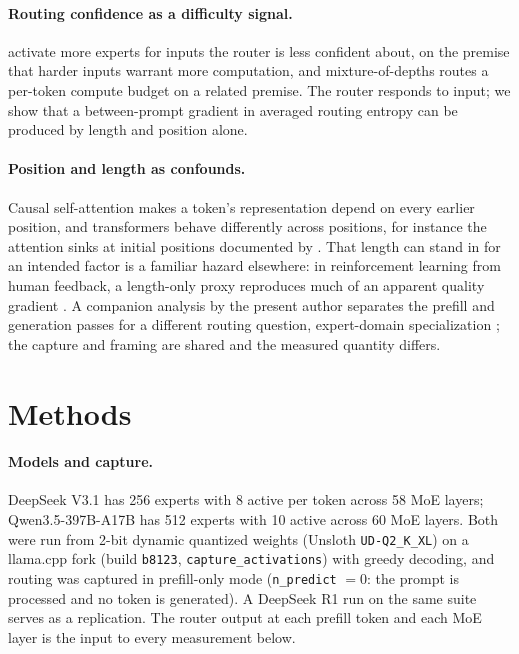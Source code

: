 \documentclass[10pt,twocolumn]{article}
\begin{document}
\paragraph{Routing confidence as a difficulty signal.}
\citet{huang2024harder} activate more experts for inputs the router is less
confident about, on the premise that harder inputs warrant more computation,
and mixture-of-depths \citep{raposo2024mixture} routes a per-token compute
budget on a related premise. The router responds to input; we show that a between-prompt gradient in
averaged routing entropy can be produced by length and position alone.

\paragraph{Position and length as confounds.}
Causal self-attention \citep{vaswani2017attention} makes a token's
representation depend on every earlier position, and transformers behave
differently across positions, for instance the attention sinks at initial
positions documented by \citet{xiao2024streaming}. That length can stand in
for an intended factor is a familiar hazard elsewhere: in reinforcement
learning from human feedback, a length-only proxy reproduces much of an
apparent quality gradient \citep{singhal2024length}. A companion analysis
by the present author separates the prefill and generation passes for a
different routing question, expert-domain specialization
\citep{shorthill2026generation}; the capture and framing are shared and the
measured quantity differs.

\section{Methods}
\label{sec:methods}

\paragraph{Models and capture.}
DeepSeek V3.1 \citep{deepseekai2024v3} has 256 experts with 8 active per
token across 58 MoE layers; Qwen3.5-397B-A17B \citep{yang2025qwen3} has 512
experts with 10 active across 60 MoE layers. Both were run from 2-bit dynamic
quantized weights (Unsloth \texttt{UD-Q2\_K\_XL}) on a llama.cpp fork (build
\texttt{b8123}, \texttt{capture\_activations}) with greedy decoding, and
routing was captured in prefill-only mode (\texttt{n\_predict} $=0$: the
prompt is processed and no token is generated). A DeepSeek R1 run
\citep{deepseekai2025r1} on the same suite serves as a replication. The
router output at each prefill token and each MoE layer is the input to
every measurement below.
\end{document}

